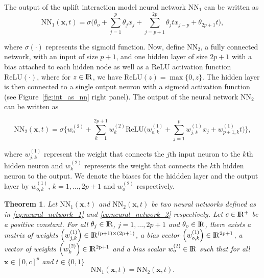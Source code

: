 \documentclass{article}
\def\x{\mathbf x}
\def\r{\mathbf r}
\def \real{\rm I\!R}
\def \r {\mathrm{ReLU}}
\newtheorem{theorem}{Theorem}
\begin{document}
The output of the uplift interaction model neural network $\mathrm{NN}_1$ can be written as
\begin{equation}
    \mathrm{NN}_1(\x,t) = \sigma \Big(\theta_o + \sum_{j=1}^{p} \theta_j x_j + \sum_{j=p+1}^{2p} \theta_j t x_{j-p} +  \theta_{2p+1} t  \Big),
    \label{eq:neural_network_1}
\end{equation}

where $\sigma(\cdot)$ represents the sigmoid function. Now, define $\mathrm{NN}_2$, a fully connected network, with an input of size $p+1$, and one hidden layer of size $2p+1$ with a bias attached to each hidden node as well as a ReLU activation function $\r(\cdot)$, where for $z \in \real$, we have $\r(z) = \max\{0,z\}$. The hidden layer is then connected to a single output neuron with a sigmoid activation function (see Figure~\ref{fig:int_as_nn} right panel). The output of the neural network $\mathrm{NN}_2$ can be written as

\begin{equation}
    \mathrm{NN}_2(\x,t) = \sigma \biggl\{ w_o^{(2)} + \sum_{k=1}^{2p+1} w_k^{(2)}  \r\Big(w_{o,k}^{(1)} + \sum_{j=1}^{p} w_{j,k}^{(1)} x_j +  w_{p+1,k}^{(1)} t \Big)  \biggr\},
    \label{eq:neural_network_2}
\end{equation}

where $w_{j,k}^{(1)}$ represent the weight that connects the $j$th input neuron to the $k$th hidden neuron and $w_k^{(2)}$ represents the weight that connects the $k$th hidden neuron to the output. We denote the biases for the hiddden layer and the output layer by $w_{o,k}^{(1)}$, $k=1,\ldots,2p+1$  and $w_o^{(2)}$ respectively.



\begin{theorem} \label{theorem}
Let $\mathrm{NN}_1(\x,t)$ and $\mathrm{NN}_2(\x,t)$ be two neural networks defined as in \eqref{eq:neural_network_1} and \eqref{eq:neural_network_2} respectively. Let $c \in \real^+$ be a positive constant. For all $\theta_j \in \real$, $j=1,\ldots,2p+1$ and $\theta_o \in \real$, there exists a matrix of weights $\Big(w_{j,k}^{(1)}\Big) \in \real^{(p+1) \times (2p+1)}$, a bias vector $\Big(w_{o,k}^{(1)}\Big) \in \real^{2p+1}$, a vector of weights $\Big(w_{k}^{(2)}\Big) \in \real^{2p+1}$ and a bias scalar $w_o^{(2)} \in \real$ such that  for all $\x \in [0,c]^p$ and $t \in \{0,1\}$
\begin{equation}
    \mathrm{NN}_1(\x,t) = \mathrm{NN}_2(\x,t).
    \label{eq:theorem_equality}
\end{equation}
\end{theorem}
\end{document}
